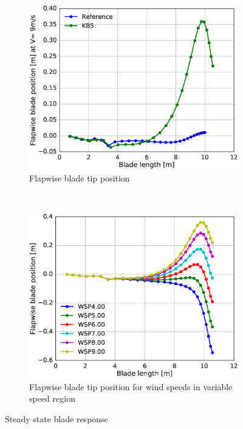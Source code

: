 \begin{figure}[tph]
\begin{subfigure}{0.50\textwidth}
\includegraphics[width=\linewidth]{figures/KB6_final/KB5_Flap_deflec_HS2.eps}
\caption{Flapwise blade tip position}
\label{subfig:KB5_flap_posn}
\end{subfigure}
 ~
\begin{subfigure}{0.50\textwidth}
\includegraphics[width=\linewidth]{figures/KB6_final/KB5_Flap_deflec_WSP_HS2.eps}
\caption{Flapwise blade tip position for wind speeds in variable speed region}
\label{subfig:KB5_flap_pson_diffwsp}
\end{subfigure}

\caption{Steady state blade response}
\label{fig:KB5_deflections}
\end{figure}

